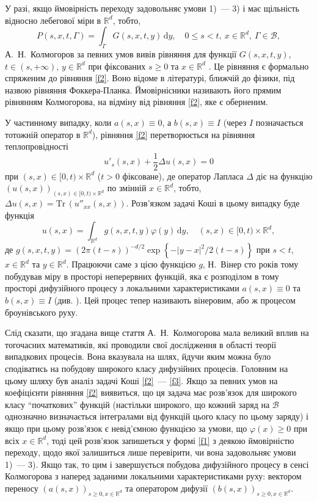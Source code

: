\documentclass[11pt, reqno]{amsart}
\begin{document}
У разі, якщо ймовірність переходу задовольняє умови 1)~--- 3) і має щільність відносно лебегової міри в $\mathbb{R}^d$, тобто,
\[
P(s,x,t,\Gamma)=\int_\Gamma G(s,x,t,y)\,\mathrm{d}y,\quad 0\le s<t,\ x\in\mathbb{R}^d,\ \Gamma\in\mathcal{B},
\]
 А.~Н.~Колмогоров за певних умов вивів рівняння для функції $G(s,x,t,y)$, $t\in(s,+\infty)$, $y\in\mathbb{R}^d$ при фіксованих $s\ge0$ та $x\in\mathbb{R}^d$ . Це рівняння є формально спряженим до рівняння \eqref{f2}. Воно відоме в літературі, ближчій до фізики, під назвою рівняння Фоккера-Планка. Ймовірнісники називають його прямим рівнянням Колмогорова, на відміну від рівняння \eqref{f2}, яке є оберненим.

У частинному випадку, коли $a(s,x)\equiv0$, а $b(s,x)\equiv I$ (через $I$ позначається тотожній оператор в $\mathbb{R}^d$), рівняння \eqref{f2} перетворюється на рівняння теплопровідності
\begin{equation}
\label{f4}
u'_s(s,x)+\frac{1}{2}\Delta u(s,x)=0
\end{equation}
при $(s,x)\in[0,t)\times\mathbb{R}^d$ ($t>0$ фіксоване), де оператор Лапласа $\Delta$ діє на функцію $(u(s,x))_{(s,x)\in[0,t)\times\mathbb{R}^d}$ по змінній $x\in\mathbb{R}^d$, тобто, $\Delta u(s,x)=\mathrm{Tr}\,(u''_{xx}(s,x))$. Розв'язком задачі Коші в цьому випадку буде функція
\[
u(s,x)=\int_{\mathbb{R}^d} g(s,x,t,y)\varphi(y)\,\mathrm{d}y,\quad (s,x)\in[0,t)\times\mathbb{R}^d,
\]
де $g(s,x,t,y)=(2\pi(t-s))^{-d/2}\exp\left\{-|y-x|^2/2(t-s)\right\}$ при $s<t$, $x\in\mathbb{R}^d$ та $y\in\mathbb{R}^d$. Працюючи саме з цією функцією $g$, Н.~Вінер сто років тому побудував міру в просторі неперервних функцій, яка є розподілом в тому просторі дифузійного процесу з локальними характеристиками $a(s,x)\equiv0$ та $b(s,x)\equiv I$ (див. \cite{b2}). Цей процес тепер називають вінеровим, або ж процесом броунівського руху.

Слід сказати, що згадана вище стаття А.~Н.~Колмогорова мала великий вплив на тогочасних математиків, які проводили свої дослідження в області теорії випадкових процесів. Вона вказувала на шлях, йдучи яким можна було сподіватись на побудову широкого класу дифузійних процесів. Головним на цьому шляху був аналіз задачі Коші \eqref{f2}~--- \eqref{f3}. Якщо за певних умов на коефіцієнти рівняння \eqref{f2} виявиться, що ця задача має розв'язок для широкого класу ``початкових'' функцій (настільки широкого, що кожний заряд на $\mathcal{B}$ однозначно визначається інтегралами від функцій цього класу по цьому заряду) і якщо при цьому розв'язок є невід'ємною функцією за умови, що $\varphi(x)\ge0$ при всіх $x\in\mathbb{R}^d$, тоді цей розв'язок запишеться у формі \eqref{f1} з деякою ймовірністю переходу, щодо якої залишиться лише перевірити, чи вона задовольняє умови 1)~--- 3). Якщо так, то цим і завершується побудова дифузійного процесу в сенсі Колмогорова з наперед заданими локальними характеристиками руху: вектором переносу $(a(s,x))_{s\ge0,x\in\mathbb{R}^d}$ та оператором дифузії $(b(s,x))_{s\ge0,x\in\mathbb{R}^d}$.
\end{document}
